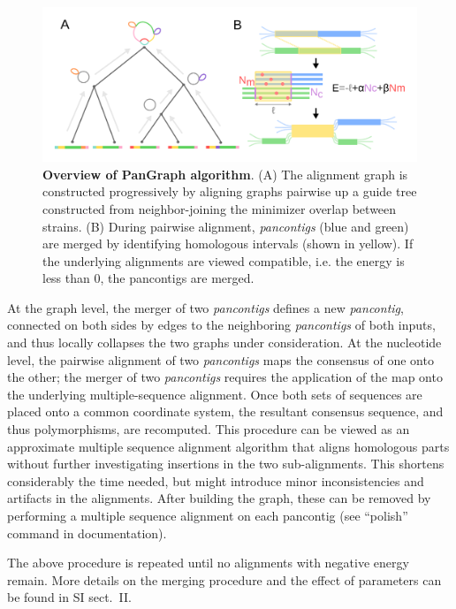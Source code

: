 \documentclass[aps,rmp,preprint,superscriptaddress,10pt,linenumbers]{revtex4-1}
\newcommand{\SIalgo}{II}
\begin{document}
\begin{figure}[htb]
    \includegraphics[width=.45\textwidth]{figs/algorithm.pdf}
    \caption{{\bf Overview of PanGraph algorithm}.
        (A) The alignment graph is constructed progressively by aligning graphs pairwise up a guide tree constructed from neighbor-joining the minimizer overlap between strains.
        (B) During pairwise alignment, \emph{pancontigs} (blue and green)
        are merged by identifying homologous intervals (shown in yellow).
        If the underlying alignments are viewed compatible, i.e. the energy is less than 0, the pancontigs are merged.
    }
    \label{fig:visualization}
\end{figure}

At the graph level, the merger of two \emph{pancontigs} defines a new \emph{pancontig}, connected on both sides by edges to the neighboring \emph{pancontigs} of both inputs, and thus locally collapses the two graphs under consideration.
At the nucleotide level, the pairwise alignment of two \emph{pancontigs} maps the consensus of one onto the other; the merger of two \emph{pancontigs} requires the application of the map onto the underlying multiple-sequence alignment.
Once both sets of sequences are placed onto a common coordinate system, the resultant consensus sequence, and thus polymorphisms, are recomputed.
This procedure can be viewed as an approximate multiple sequence alignment algorithm that aligns homologous parts without further investigating insertions in the two sub-alignments. This shortens considerably the time needed, but might introduce minor inconsistencies and artifacts in the alignments. After building the graph, these can be removed by performing a multiple sequence alignment on each pancontig  (see ``polish'' command in documentation).

The above procedure is repeated until no alignments with negative energy remain.
More details on the merging procedure and the effect of parameters can be found in SI sect.~\SIalgo.
\end{document}
